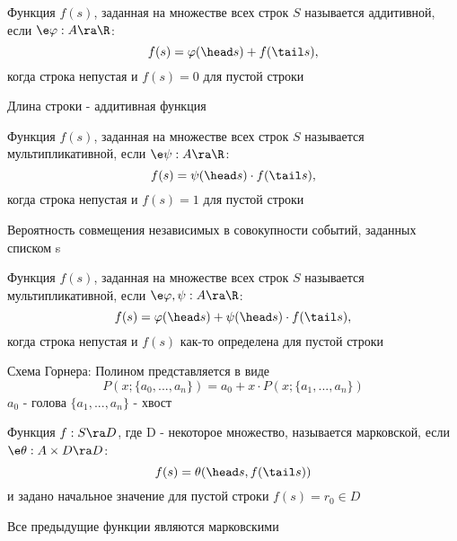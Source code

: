 \documentclass[discrete.tex]{subfiles}
\begin{document}
  \begin{definition}
    Функция $f(s)$, заданная на множестве всех строк $S$ называется аддитивной, если $\e \varphi: A \ra \R$:
    \[f(s) = \varphi(\head s) + f(\tail s),\]
    когда строка непустая и $f(s) = 0$ для пустой строки
  \end{definition}

  \begin{example}
    Длина строки - аддитивная функция
  \end{example}

  \begin{definition}
    Функция $f(s)$, заданная на множестве всех строк $S$ называется мультипликативной, если $\e \psi: A \ra \R$:
    \[f(s) = \psi(\head s) \cdot f(\tail s),\]
    когда строка непустая и $f(s) = 1$ для пустой строки
  \end{definition}

  \begin{example}
    Вероятность совмещения независимых в совокупности событий, заданных списком s
  \end{example}

  \begin{definition}
    Функция $f(s)$, заданная на множестве всех строк $S$ называется мультипликативной, если $\e \varphi, \psi: A \ra \R$:
    \[f(s) = \varphi(\head s) + \psi(\head s) \cdot f(\tail s),\]
    когда строка непустая и $f(s)$ как-то определена для пустой строки
  \end{definition}

  \begin{example}
    Схема Горнера: Полином представляется в виде
    \[P(x;\{a_0,...,a_n\}) = a_0 + x \cdot P(x; \{a_1,...,a_n\})\]
    $a_0$ - голова $\{a_1,...,a_n\}$ - хвост
  \end{example}

  \begin{definition}
    Функция $f: S \ra D$, где D - некоторое множество, называется марковской, если $\e \theta: A \times D \ra D$:
    \[f(s) = \theta(\head s, f(\tail s))\]
    и задано начальное значение для пустой строки $f(s) = r_0 \in D$
  \end{definition}

  \begin{remark}
    Все предыдущие функции являются марковскими
  \end{remark}
\end{document}
